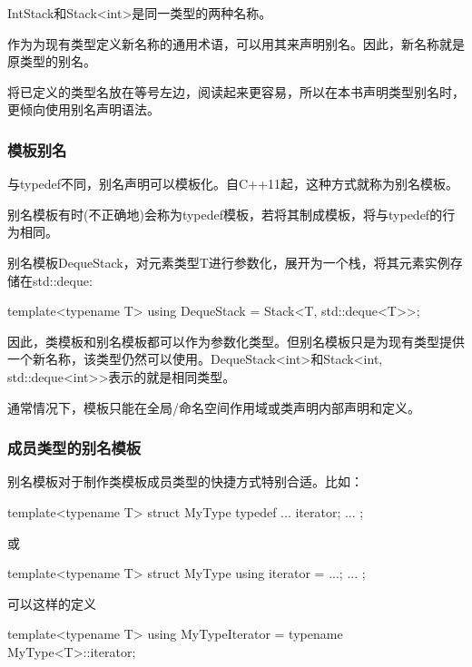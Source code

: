 IntStack和Stack<int>是同一类型的两种名称。

作为为现有类型定义新名称的通用术语，可以用其来声明别名。因此，新名称就是原类型的别名。

将已定义的类型名放在等号左边，阅读起来更容易，所以在本书声明类型别名时，更倾向使用别名声明语法。

\subsubsection{模板别名}

与typedef不同，别名声明可以模板化。自C++11起，这种方式就称为别名模板。

\begin{notice}
别名模板有时(不正确地)会称为typedef模板，若将其制成模板，将与typedef的行为相同。
\end{notice}

别名模板DequeStack，对元素类型T进行参数化，展开为一个栈，将其元素实例存储在std::deque:

\begin{cpp}
template<typename T>
using DequeStack = Stack<T, std::deque<T>>;
\end{cpp}

因此，类模板和别名模板都可以作为参数化类型。但别名模板只是为现有类型提供一个新名称，该类型仍然可以使用。DequeStack<int>和Stack<int, std::deque<int>>表示的就是相同类型。

通常情况下，模板只能在全局/命名空间作用域或类声明内部声明和定义。

\subsubsection{成员类型的别名模板}

别名模板对于制作类模板成员类型的快捷方式特别合适。比如：

\begin{cpp}
template<typename T> struct MyType {
	typedef ... iterator;
	...
};
\end{cpp}

或

\begin{cpp}
template<typename T> struct MyType {
	using iterator = ...;
	...
};
\end{cpp}

可以这样的定义

\begin{cpp}
template<typename T>
using MyTypeIterator = typename MyType<T>::iterator;
\end{cpp}


